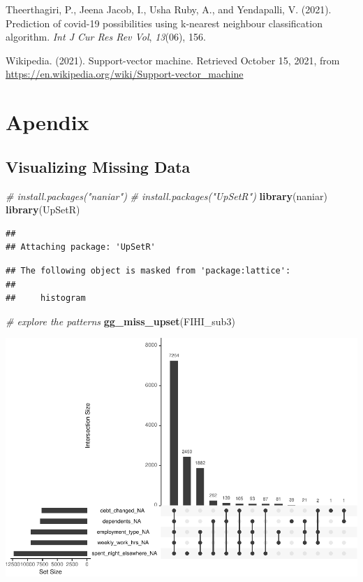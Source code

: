 \documentclass[
  10pt,
]{article}
\newenvironment{Shaded}{\begin{snugshade}}{\end{snugshade}}
\newcommand{\CommentTok}[1]{\textcolor[rgb]{0.56,0.35,0.01}{\textit{#1}}}
\newcommand{\KeywordTok}[1]{\textcolor[rgb]{0.13,0.29,0.53}{\textbf{#1}}}
\newcommand{\NormalTok}[1]{#1}
\begin{document}
\leavevmode\hypertarget{ref-theerthagiri2021prediction}{}%
Theerthagiri, P., Jeena Jacob, I., Usha Ruby, A., and Yendapalli, V. (2021). Prediction of covid-19 possibilities using k-nearest neighbour classification algorithm. \emph{Int J Cur Res Rev\textbar{} Vol}, \emph{13}(06), 156.

\leavevmode\hypertarget{ref-wikipedia}{}%
Wikipedia. (2021). Support-vector machine. Retrieved October 15, 2021, from \url{https://en.wikipedia.org/wiki/Support-vector_machine}

\hypertarget{apendix}{%
\section{Apendix}\label{apendix}}

\hypertarget{visualizing-missing-data}{%
\subsection{Visualizing Missing Data}\label{visualizing-missing-data}}

\begin{Shaded}
\begin{Highlighting}[]
\CommentTok{# install.packages("naniar")}
\CommentTok{# install.packages("UpSetR")}
\KeywordTok{library}\NormalTok{(naniar)}
\KeywordTok{library}\NormalTok{(UpSetR)}
\end{Highlighting}
\end{Shaded}

\begin{verbatim}
## 
## Attaching package: 'UpSetR'
\end{verbatim}

\begin{verbatim}
## The following object is masked from 'package:lattice':
## 
##     histogram
\end{verbatim}

\begin{Shaded}
\begin{Highlighting}[]
\CommentTok{# explore the patterns}
\KeywordTok{gg_miss_upset}\NormalTok{(FIHI_sub3)}
\end{Highlighting}
\end{Shaded}

\includegraphics{phase1_report_files/figure-latex/unnamed-chunk-4-1}
\end{document}
